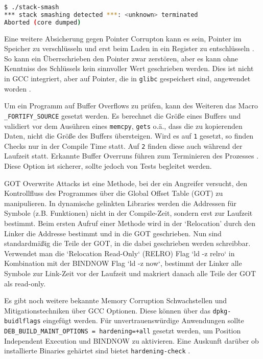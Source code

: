 \begin{lstlisting}[language=bash]
$ ./stack-smash
*** stack smashing detected ***: <unknown> terminated
Aborted (core dumped)
\end{lstlisting}

Eine weitere Absicherung gegen Pointer Corrupton kann es sein, Pointer im Speicher zu verschlüsseln und erst beim Laden in ein Register zu entschlüsseln \cite{pointguard}. So kann ein Überrschrieben den Pointer zwar zerstören, aber es kann ohne Kenntniss des Schlüssels kein sinnvoller Wert geschrieben werden. Dies ist nicht in GCC integriert, aber auf Pointer, die in \texttt{glibc} gespeichert sind, angewendet worden \cite{ubuntu-security}.

Um ein Programm auf Buffer Overflows zu prüfen, kann des Weiteren das Macro \texttt{\_FORTIFY\_SOURCE} gesetzt werden. Es berechnet die Größe eines Buffers und validiert vor dem Ausühren eines \texttt{memcpy}, \texttt{gets} o.ä., dass die zu kopierenden Daten, nicht die Größe des Buffers übersteigen.
Wird es auf \texttt{1} gesetzt, so finden Checks nur in der Compile Time statt. Auf \texttt{2} finden diese auch während der Laufzeit statt. Erkannte Buffer Overruns führen zum Terminieren des Prozesses \cite{man-fortify}. Diese Option ist sicherer, sollte jedoch von Tests begleitet werden. 


GOT Overwrite Attacks ist eine Methode, bei der ein Angreifer versucht, den Kontrollfluss des Programmes über die Global Offset Table (GOT) zu manipulieren. In dynamische gelinkten Libraries werden die Addressen für Symbole (z.B. Funktionen) nicht in der Compile-Zeit, sondern erst zur Laufzeit bestimmt. Beim ersten Aufruf einer Methode wird in der `Relocation' durch den Linker die Addresse bestimmt und in die GOT geschrieben. Nun sind standardmäßig die Teile der GOT, in die dabei geschrieben werden schreibbar. 
Verwendet man die `Relocation Read-Only` (RELRO) Flag `ld -z relro` in Kombination mit der BINDNOW Flag `ld -z now`, bestimmt der Linker alle Symbole zur Link-Zeit vor der Laufzeit und makriert danach alle Teile der GOT als read-only. \cite{relro}

Es gibt noch weitere bekannte Memory Corruption Schwachstellen und Mitigationstechniken über GCC Optionen. Diese können über das \texttt{dpkg-buidlflags} eingefügt werden. Für unvertrauenswürdige Anwendungen sollte \texttt{DEB\_BUILD\_MAINT\_OPTIONS = hardening=+all} gesetzt werden, um Position Independent Execution und BINDNOW zu aktivieren. Eine Auskunft darüber ob installierte Binaries gehärtet sind bietet \texttt{hardening-check} \cite{debian-hardening}. 



